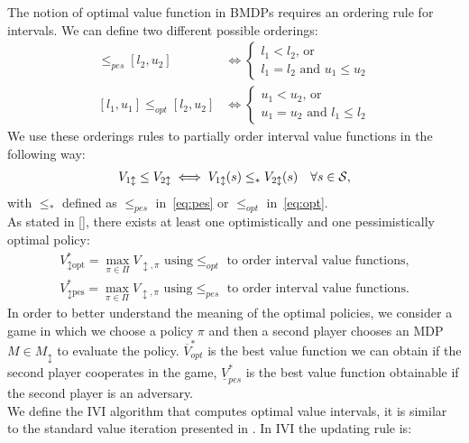 \newline
The notion of optimal value function in \ac{BMDP}s requires an ordering rule for intervals. We can define two different possible orderings:
\begin{align}
[l_1, u_1] \leq_{pes} [l_2, u_2] &\Leftrightarrow 
\begin{cases}
l_1 < l_2 \text{, or }\\
l_1 = l_2 \text{ and } u_1 \leq u_2
\end{cases} \label{eq:pes}\\
[l_1, u_1] \leq_{opt} [l_2, u_2] &\Leftrightarrow 
\begin{cases}
u_1 < u_2 \text{, or }\\
u_1 = u_2 \text{ and } l_1 \leq l_2
\end{cases} \label{eq:opt}
\end{align}
We use these orderings rules to partially order interval value functions in the following way:
\begin{align} V_{1 \updownarrow} \leq V_{2 \updownarrow} \iff V_{1 \updownarrow}(s) \leq_{*} V_{2 \updownarrow}(s) \quad \forall s \in \mathcal{S}, \end{align}
with $\leq_{*}$ defined as $\leq_{pes}$ in~\eqref{eq:pes} or $\leq_{opt}$ in~\eqref{eq:opt}.\\
\newline
As stated in [\cite{givan2000bounded}], there exists at least one optimistically and one pessimistically optimal policy:
\begin{align*}
V^{*}_{\updownarrow \text{opt}} = \max_{\pi \in \Pi} V_{\updownarrow, \pi} \text{ using} \leq_{opt} \text{ to order interval value functions,}\\
V^{*}_{\updownarrow \text{pes}} = \max_{\pi \in \Pi} V_{\updownarrow, \pi} \text{ using} \leq_{pes} \text{ to order interval value functions.}
\end{align*}
In order to better understand the meaning of the optimal policies, we consider a game in which we choose a policy $\pi$ and then a second player chooses an \ac{MDP} $M \in M_{\updownarrow}$ to evaluate the policy. $\overline{V}^{*}_{opt}$ is the best value function we can obtain if the second player cooperates in the game, $\underline{V}^{*}_{pes}$ is the best value function obtainable if the second player is an adversary.\\
\newline
We define the \acf{IVI} algorithm that computes optimal value intervals, it is similar to the standard value iteration presented in . In \ac{IVI} the updating rule is:
